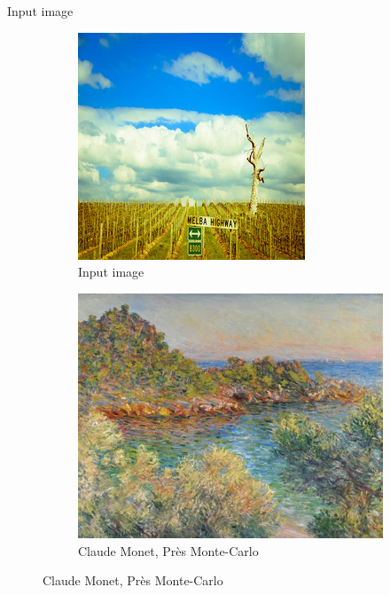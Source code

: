 \documentclass[12pt]{beamer}
\begin{document}
    \begin{frame}{Input image}
        \begin{figure}[H]
            \centering
            \begin{subfigure}[b]{0.55\textwidth}
                \centering
                \includegraphics[width=\textwidth]{resources/cycle-gan/test4.jpg}
                \caption{Input image}
            \end{subfigure}
            \hfill
            \begin{subfigure}[b]{0.4\textwidth}
                \centering
                \includegraphics[width=\textwidth]{resources/cycle-gan/monet.png}
                \caption{Claude Monet, Près Monte-Carlo}
            \end{subfigure}
        \end{figure}
    \end{frame}
    
\end{document}
